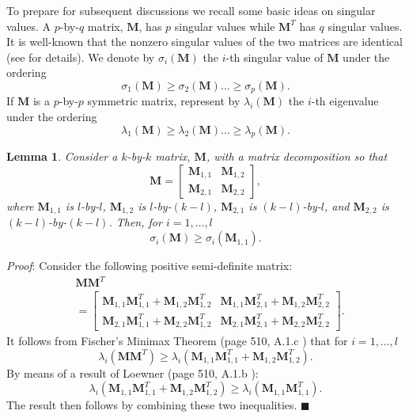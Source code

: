 \documentclass[12pt,onecolumn,draftcls]{IEEEtran}
\newtheorem{lemma}{Lemma}[section]
\begin{document}
To prepare for subsequent discussions
we recall some basic ideas on singular values.   A $p$-by-$q$ matrix, 
$\mathbf{M}$, has $p$ singular values while $\mathbf{M}^T$ has $q$ singular values.  It is well-known that the nonzero singular
values of the two matrices are identical (see \cite{mo} for details).
We denote by $\sigma_i(\mathbf{M})$ the $i$-th singular value of $\mathbf{M}$
under the ordering
\begin{equation}
\sigma_1(\mathbf{M}) \geq \sigma_2(\mathbf{M}) \ldots \geq \sigma_p(\mathbf{M}).
\end{equation}
If $\mathbf{M}$ is a $p$-by-$p$ symmetric matrix, represent by $\lambda_i(\mathbf{M})$ the $i$-th eigenvalue under the ordering
\begin{equation}
\lambda_1(\mathbf{M}) \geq \lambda_2(\mathbf{M}) \ldots \geq \lambda_p(\mathbf{M}).
\end{equation}

\begin{lemma}
Consider a $k$-by-$k$ matrix, $\mathbf{M}$, with a matrix decomposition so that
\begin{equation}
\mathbf{M}=\left[
\begin{array}{ll}
\mathbf{M}_{1,1} & \mathbf{M}_{1,2}\\
\mathbf{M}_{2,1} & \mathbf{M}_{2,2}
\end{array}
\right],
\end{equation}
where $\mathbf{M}_{1,1}$ is $l$-by-$l$,
$\mathbf{M}_{1,2}$ is $l$-by-$(k-l)$, $\mathbf{M}_{2,1}$ is $(k-l)$-by-$l$,
and $\mathbf{M}_{2,2}$ is $(k-l)$-by-$(k-l)$.  Then, for $i=1, \ldots, l$
\begin{equation}
\sigma_i(\mathbf{M}) \geq \sigma_i(\mathbf{M}_{1,1}).
\end{equation}
\end{lemma}

\noindent
\textit{Proof}:  Consider the following positive semi-definite matrix:
\begin{align}
& \mathbf{MM}^T \nonumber \\
&=\left[
\begin{array}{ll}
\mathbf{M}_{1,1} \mathbf{M}_{1,1}^T + \mathbf{M}_{1,2}\mathbf{M}_{1,2}^T
& \mathbf{M}_{1,1}\mathbf{M}_{2,1}^T + \mathbf{M}_{1,2}\mathbf{M}_{2,2}^T\\
\mathbf{M}_{2,1}\mathbf{M}_{1,1}^T + \mathbf{M}_{2,2}\mathbf{M}_{1,2}^T
& \mathbf{M}_{2,1}\mathbf{M}_{2,1}^T + \mathbf{M}_{2,2}\mathbf{M}_{2,2}^T
\end{array}
\right].
\end{align}
It follows from Fischer's Minimax Theorem (page 510, A.1.c \cite{mo}) that for
$i=1, \ldots, l$
\begin{equation}
\lambda_i(\mathbf{MM}^T) \geq \lambda_i(\mathbf{M}_{1,1}\mathbf{M}_{1,1}^T + \mathbf{M}_{1,2}\mathbf{M}_{1,2}^T).
\end{equation}
By means of a result of Loewner (page 510, A.1.b \cite{mo}):
\begin{equation}
\lambda_i(\mathbf{M}_{1,1}\mathbf{M}_{1,1}^T + \mathbf{M}_{1,2}\mathbf{M}_{1,2}^T)
\geq \lambda_i(\mathbf{M}_{1,1}\mathbf{M}_{1,1}^T ).
\end{equation}
The result then follows by combining these two inequalities.   \hfill $\blacksquare$
\end{document}
